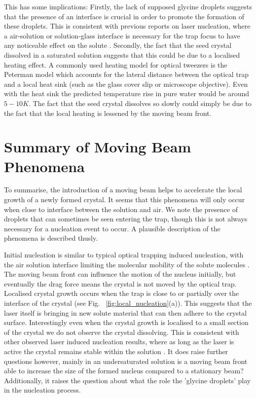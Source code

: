 This has some implications: Firstly, the lack of supposed 
glycine droplets suggests that the presence of an interface 
is crucial in order to promote the formation of these droplets. 
This is consistent with previous reports on laser nucleation, 
where a air-solution or solution-glass interface is necessary 
for the trap focus to have any noticeable effect on the solute \cite{Gowayed2021, Liao2022, Rungsimanon2010}. Secondly, the 
fact that the seed crystal dissolved in a saturated solution 
suggests that this could be due to a localised heating effect. 
A commonly used heating model for optical tweezers is the 
Peterman model \cite{Peterman2003} which accounts for the lateral 
distance between the optical trap and a local heat sink (such 
as the glass cover slip or microscope objective). Even with 
the heat sink the predicted temperature rise in pure water would 
be around $5-10 K$.  The fact that the seed crystal dissolves 
so slowly could simply be due to the fact that the local heating 
is lessened by the moving beam front.
 
\section{Summary of Moving Beam Phenomena}
To summarise, the introduction of a moving beam helps to 
accelerate the local growth of a newly formed crystal. It 
seems that this phenomena will only occur when close to 
interface between the solution and air. We note the presence
of droplets that can sometimes be seen entering the trap, 
though this is not always necessary for a nucleation event 
to occur. A plausible description of the phenomena is described
thusly. 

Initial nucleation is similar to typical optical trapping 
induced nucleation, with the air solution interface limiting 
the molecular mobility of the solute molecules \cite{Liao2022, 
Sugiyama2009, Gowayed2021}. The moving beam front can influence 
the motion of the nucleus initially, but eventually the drag 
force means the crystal is not moved by the optical trap. 
Localised crystal growth occurs when the trap is close to or 
partially over the interface of the crystal (see Fig.~
\ref{fig:local_nucleation}(a)). This suggests that the 
laser itself is bringing in new solute material that can then
adhere to the crystal surface. Interestingly even when the 
crystal growth is localised to a small section of the crystal
we do not observe the crystal dissolving. This is consistent 
with other observed laser induced nucleation results, where 
as long as the laser is active the crystal remains stable 
within the solution \cite{Flannigan2023, Rungsimanon2010,
Liao2022, Sugiyama2009}. It does raise further questions 
however, mainly in an undersaturated solution is a moving 
beam front able to increase the size of the formed nucleus
compared to a stationary beam? Additionally, it raises the 
question about what the role the 'glycine droplets' play in 
the nucleation process.

